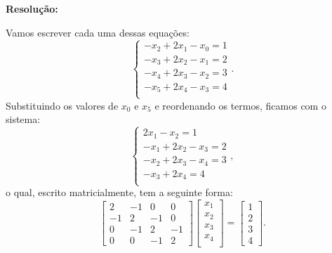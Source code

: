 \documentclass[leqno]{article}
\newenvironment{sol}
{
    \vspace{4mm}
    \noindent\textbf{Resolução:}
    \strut\newline
    \smallskip
    \hspace{-3.5mm}
}
{}
\begin{document}
\begin{enumerate}
\begin{sol} 
    Vamos escrever cada uma dessas equações:
    \begin{equation*}
        \begin{cases}
            -x_{ 2 } + 2 x_{ 1 } - x_{ 0 } = 1 \\
            -x_{ 3 } + 2 x_{ 2 } - x_{ 1 } = 2 \\
            -x_{ 4 } + 2 x_{ 3 } - x_{ 2 } = 3 \\
            -x_{ 5 } + 2 x_{ 4 } - x_{ 3 } = 4 \\
        \end{cases}
    .\end{equation*}
    Substituindo os valores de \( x_{ 0 } \) e \( x_{ 5 } \) e reordenando os termos, ficamos com o sistema:
    \begin{equation*}
        \begin{cases}
            2 x_{ 1 } - x_{ 2 }  = 1 \\
            - x_{ 1 } + 2 x_{ 2 } - x_{ 3 } = 2 \\
            - x_{ 2 } + 2 x_{ 3 } - x_{ 4 } = 3 \\
            - x_{ 3 } + 2 x_{ 4 } = 4 \\
        \end{cases}
    ,\end{equation*}
    o qual, escrito matricialmente, tem a seguinte forma:
    \begin{equation*}
        \begin{bmatrix}
            2 & -1 & 0 & 0 \\
            -1 & 2 & -1 & 0 \\
            0 & -1 & 2 & -1 \\
            0 & 0 & -1 & 2
        \end{bmatrix}
        \begin{bmatrix}
            x_{ 1 } \\
            x_{ 2 } \\
            x_{ 3 } \\
            x_{ 4 } \\
        \end{bmatrix}
        =
        \begin{bmatrix}
            1 \\
            2 \\
            3 \\
            4
        \end{bmatrix}
    .\end{equation*}

\end{sol}
\end{enumerate}
\end{document}
